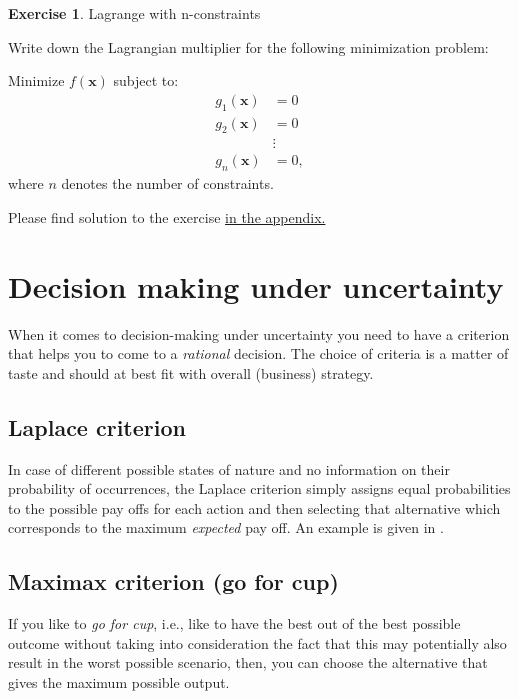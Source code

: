 \documentclass[
  12pt,
  oneside]{book}
\theoremstyle{definition}
\theoremstyle{definition}
\theoremstyle{definition}
\newtheorem{exercise}{Exercise}[chapter]
\theoremstyle{definition}
\theoremstyle{remark}
\begin{document}
\begin{exercise}
\protect\hypertarget{exr:lagrcons}{}\label{exr:lagrcons}Lagrange with n-constraints

Write down the Lagrangian multiplier for the following minimization problem:

Minimize \(f(\mathbf{x})\) subject to:
\[\begin{aligned}
    g_1(\mathbf{x})&=0 \\
    g_2(\mathbf{x})&=0\\
    &\vdots\\
    g_n(\mathbf{x})&=0,\end{aligned}\]
where \(n\) denotes the number of constraints.
\end{exercise}

Please find solution to the exercise \protect\hyperlink{sol:lagrcons}{in the appendix.}

\hypertarget{decision-making-under-uncertainty}{%
\section{Decision making under uncertainty}\label{decision-making-under-uncertainty}}

When it comes to decision-making under uncertainty you need to have a criterion that helps you to come to a \emph{rational} decision. The choice of criteria is a matter of taste and should at best fit with overall (business) strategy.

\hypertarget{laplace-criterion}{%
\subsection*{Laplace criterion}\label{laplace-criterion}}

In case of different possible states of nature and no information on their probability of occurrences, the Laplace criterion simply assigns equal probabilities to the possible pay offs for each action and then selecting that alternative which corresponds to the maximum \emph{expected} pay off. An example is given in \citet{Finne1998three}.

\hypertarget{maximax-criterion-go-for-cup}{%
\subsection*{Maximax criterion (go for cup)}\label{maximax-criterion-go-for-cup}}

If you like to \emph{go for cup}, i.e., like to have the best out of the best possible outcome without taking into consideration the fact that this may potentially also result in the worst possible scenario, then, you can choose the alternative that gives the maximum possible output.
\end{document}
